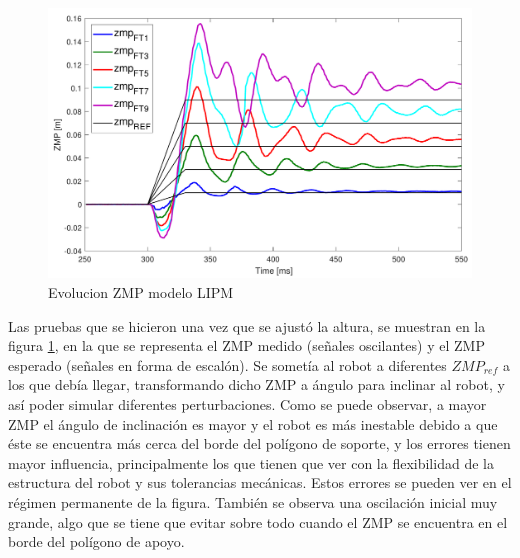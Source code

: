 \begin{figure}[H]
\centering
\includegraphics[scale=0.6]{imagenes/apartado_5/5.1/figura3.pdf}
\caption{Evolucion ZMP modelo LIPM}
\label{figura54}
\end{figure}

Las pruebas que se hicieron una vez que se ajustó la altura, se muestran en la figura \ref{figura54}, en la que se representa el ZMP medido (señales oscilantes) y el ZMP esperado (señales en forma de escalón). Se sometía al robot a diferentes $ZMP_{ref}$ a los que debía llegar, transformando dicho ZMP a ángulo para inclinar al robot, y así poder simular diferentes perturbaciones. Como se puede observar, a mayor ZMP el ángulo de inclinación es mayor y el robot es más inestable debido a que éste se encuentra más cerca del borde del polígono de soporte, y los errores tienen mayor influencia, principalmente los que tienen que ver con la flexibilidad de la estructura del robot y sus tolerancias mecánicas. Estos errores se pueden ver en el régimen permanente de la figura. También se observa una oscilación inicial muy grande, algo que se tiene que evitar sobre todo cuando el ZMP se encuentra en el borde del polígono de apoyo. 

